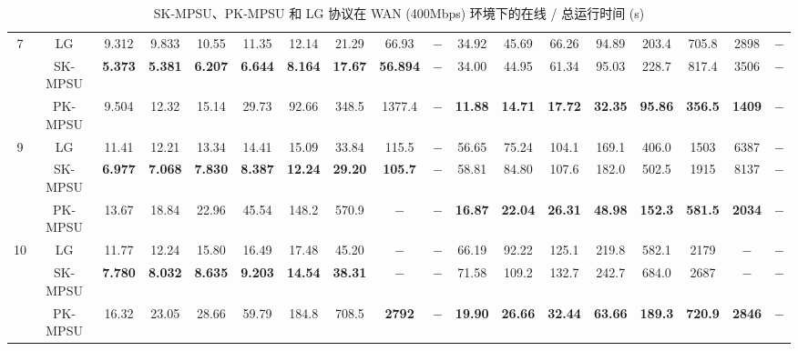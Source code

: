 \begin{table}[p]
\begin{adjustbox}{angle=90,center,scale=0.85}
\begin{tabular}{|c|c|*{16}{c|}}
\multirow{3}{*}{7} 
 & LG & 9.312 & 9.833 & 10.55 & 11.35 & 12.14 & 21.29 & 66.93 & $-$ & 34.92 & 45.69 & 66.26 & 94.89 & 203.4 & 705.8 & 2898 & $-$ \\ \cline{2-18} 
 & SK-MPSU & \textbf{5.373} & \textbf{5.381} & \textbf{6.207} & \textbf{6.644} & \textbf{8.164} & \textbf{17.67} & \textbf{56.894} & $-$ & 34.00 & 44.95 & 61.34 & 95.03 & 228.7 & 817.4 & 3506 & $-$ \\ \cline{2-18} 
 & PK-MPSU & 9.504 & 12.32 & 15.14 & 29.73 & 92.66 & 348.5 & 1377.4 & $-$ & \textbf{11.88} & \textbf{14.71} & \textbf{17.72} & \textbf{32.35} & \textbf{95.86} & \textbf{356.5} & \textbf{1409} & $-$ \\ \hline

\multirow{3}{*}{9} 
 & LG & 11.41 & 12.21 & 13.34 & 14.41 & 15.09 & 33.84 & 115.5 & $-$ & 56.65 & 75.24 & 104.1 & 169.1 & 406.0 & 1503 & 6387 & $-$ \\ \cline{2-18} 
 & SK-MPSU & \textbf{6.977} & \textbf{7.068} & \textbf{7.830} & \textbf{8.387} & \textbf{12.24} & \textbf{29.20} & \textbf{105.7} & $-$ & 58.81 & 84.80 & 107.6 & 182.0 & 502.5 & 1915 & 8137 & $-$ \\ \cline{2-18} 
 & PK-MPSU & 13.67 & 18.84 & 22.96 & 45.54 & 148.2 & 570.9 & $-$ & $-$ & \textbf{16.87} & \textbf{22.04} & \textbf{26.31} & \textbf{48.98} & \textbf{152.3} & \textbf{581.5} & \textbf{2034} & $-$ \\ \hline

\multirow{3}{*}{10} 
 & LG & 11.77 & 12.24 & 15.80 & 16.49 & 17.48 & 45.20 & $-$ & $-$ & 66.19 & 92.22 & 125.1 & 219.8 & 582.1 & 2179 & $-$ & $-$ \\ \cline{2-18} 
 & SK-MPSU & \textbf{7.780} & \textbf{8.032} & \textbf{8.635} & \textbf{9.203} & \textbf{14.54} & \textbf{38.31} & $-$ & $-$ & 71.58 & 109.2 & 132.7 & 242.7 & 684.0 & 2687 & $-$ & $-$ \\ \cline{2-18} 
 & PK-MPSU & 16.32 & 23.05 & 28.66 & 59.79 & 184.8 & 708.5 & \textbf{2792} & $-$ & \textbf{19.90} & \textbf{26.66} & \textbf{32.44} & \textbf{63.66} & \textbf{189.3} & \textbf{720.9} & \textbf{2846} & $-$ \\ \hline
\end{tabular}%
\end{adjustbox}

\vspace*{\fill}
\caption{SK-MPSU、PK-MPSU 和 LG 协议在 WAN (400Mbps) 环境下的在线 / 总运行时间 (s)}
\label{tab:time_400mbps}
\end{table}

